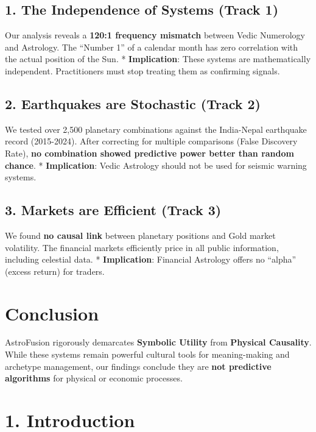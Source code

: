 \documentclass[
  11pt,
  a4paper,
  oneside,
  openany]{report}
\begin{document}
\subsection{1. The Independence of Systems (Track
1)}\label{the-independence-of-systems-track-1}

Our analysis reveals a \textbf{120:1 frequency mismatch} between Vedic
Numerology and Astrology. The ``Number 1'' of a calendar month has zero
correlation with the actual position of the Sun. * \textbf{Implication}:
These systems are mathematically independent. Practitioners must stop
treating them as confirming signals.

\subsection{2. Earthquakes are Stochastic (Track
2)}\label{earthquakes-are-stochastic-track-2}

We tested over 2,500 planetary combinations against the India-Nepal
earthquake record (2015-2024). After correcting for multiple comparisons
(False Discovery Rate), \textbf{no combination showed predictive power
better than random chance}. * \textbf{Implication}: Vedic Astrology
should not be used for seismic warning systems.

\subsection{3. Markets are Efficient (Track
3)}\label{markets-are-efficient-track-3}

We found \textbf{no causal link} between planetary positions and Gold
market volatility. The financial markets efficiently price in all public
information, including celestial data. * \textbf{Implication}: Financial
Astrology offers no ``alpha'' (excess return) for traders.

\section{Conclusion}\label{conclusion}

AstroFusion rigorously demarcates \textbf{Symbolic Utility} from
\textbf{Physical Causality}. While these systems remain powerful
cultural tools for meaning-making and archetype management, our findings
conclude they are \textbf{not predictive algorithms} for physical or
economic processes.

\newpage

\section{1. Introduction}\label{introduction}
\end{document}
